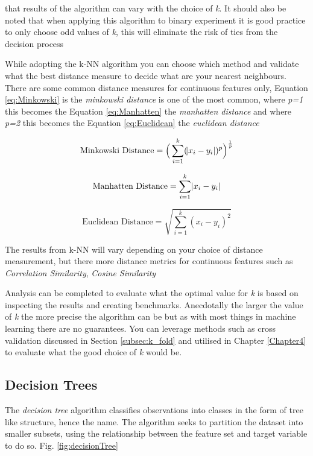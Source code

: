 that results of the algorithm can vary with the choice of \textit{k}. It should also be noted that when applying this algorithm to binary experiment it is good practice to only choose odd values of \textit{k}, this will eliminate the risk of ties from the decision process \citep{keller_fuzzy_1985} 

While adopting the k-NN algorithm you can choose which method and validate what the best distance measure to decide what are your nearest neighbours. There are some common distance measures for continuous features only, Equation \ref{eq:Minkowski} is the \textit{minkowski distance} is one of the most common, where \textit{p=1} this becomes the Equation \ref{eq:Manhatten} the \textit{manhatten distance} and where \textit{p=2} this becomes the Equation \ref{eq:Euclidean} the \textit{euclidean distance}

\begin{equation} \label{eq:Minkowski}
\text{Minkowski Distance}   = \Big(\sum_{i=1}^k (\abs{x_i-y_i})^p\Big)^\frac{1}{p}
\end{equation}

\begin{equation} \label{eq:Manhatten}
\text{Manhatten Distance}   = \sum_{i=1}^k \abs{x_i-y_i}
\end{equation}

\begin{equation} \label{eq:Euclidean}
\text{Euclidean Distance}   = \sqrt{\sum_{i=1}^k (x_i-y_i)^2}
\end{equation}

The results from k-NN will vary depending on your choice of distance measurement, but there more distance metrics for continuous features such as \textit{Correlation Similarity}, \textit{Cosine Similarity} \citep{sarwar_item-based_2001}

Analysis can be completed to evaluate what the optimal value for \textit{k} is based on inspecting the results and creating benchmarks. Anecdotally the larger the value of \textit{k} the more precise the algorithm can be but as with most things in machine learning there are no guarantees. You can leverage methods such as cross validation discussed in Section \ref{subsec:k_fold} and utilised in Chapter \ref{Chapter4} to evaluate what the good choice of \textit{k} would be.

\subsection{Decision Trees} \label{decTrees}
The \textit{decision tree} algorithm classifies observations into classes in the form of tree like structure, hence the name. The algorithm seeks to partition the dataset into smaller subsets, using the relationship between the feature set and target variable to do so. Fig. \ref{fig:decisionTree}

